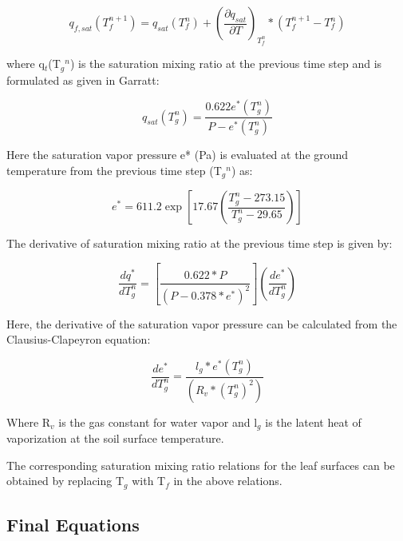 \begin{equation}
{q_{f,sat}}\left( {T_f^{n + 1}} \right) = {q_{sat}}\left( {T_f^n} \right) + {\left( {\frac{{\partial {q_{sat}}}}{{\partial T}}} \right)_{T_f^n}} * \left( {T_f^{n + 1} - T_f^n} \right)
\end{equation}

where q\(_{t}\)(T\(_{g}\)\(^{n}\)) is the saturation mixing ratio at the previous time step and is formulated as given in Garratt:

\begin{equation}
{q_{sat}}\left( {T_g^n} \right) = \frac{{0.622{e^ * }\left( {T_g^n} \right)}}{{P - {e^ * }\left( {T_g^n} \right)}}
\end{equation}

Here the saturation vapor pressure e* (Pa) is evaluated at the ground temperature from the previous time step (T\(_{g}\)\(^{n}\)) as:

\begin{equation}
{e^*} = 611.2\exp \left[ {17.67\left( {\frac{{T_g^n - 273.15}}{{T_g^n - 29.65}}} \right)} \right]
\end{equation}

The derivative of saturation mixing ratio at the previous time step is given by:

\begin{equation}
\frac{{d{q^ * }}}{{dT_g^n}} = \left[ {\frac{{0.622 * P}}{{{{\left( {P - 0.378 * {e^ * }} \right)}^2}}}} \right]\left( {\frac{{d{e^ * }}}{{dT_g^n}}} \right)
\end{equation}

Here, the derivative of the saturation vapor pressure can be calculated from the Clausius-Clapeyron equation:

\begin{equation}
\frac{{d{e^ * }}}{{dT_g^n}} = \frac{{{l_g} * {e^ * }\left( {T_g^n} \right)}}{{\left( {{R_v} * {{\left( {T_g^n} \right)}^2}} \right)}}
\end{equation}

Where R\(_{v}\) is the gas constant for water vapor and l\(_{g}\) is the latent heat of vaporization at the soil surface temperature.

The corresponding saturation mixing ratio relations for the leaf surfaces can be obtained by replacing T\(_{g}\) with T\(_{f}\) in the above relations.

\subsection{Final Equations}\label{final-equations}

